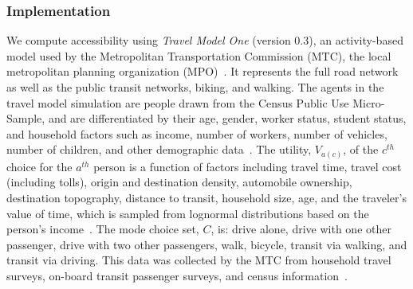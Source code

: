 \subsubsection{Implementation}
We compute accessibility using  \emph{Travel Model One} (version 0.3), an activity-based model used by the Metropolitan Transportation Commission (MTC), the local metropolitan planning organization (MPO)~\cite{erhardt_mtcs_2012}. It represents the full road network as well as the public transit networks, biking, and walking. The agents in the travel model simulation are people drawn from the Census Public Use Micro-Sample, and are differentiated by their age, gender, worker status, student status, and household factors such as income, number of workers, number of vehicles, number of children, and other demographic data~\cite{ory_personal_2013,erhardt_mtcs_2012,waddell_urbansim:_2002,u.s._bureau_of_the_census_united_2010}. The utility, $V_{a(c)}$, of the $c^{th}$ choice for the $a^{th}$ person is a function of factors including travel time, travel cost (including tolls), origin and destination density, automobile ownership, destination topography, distance to transit, household size, age, and the traveler's value of time, which is sampled from lognormal distributions based on the person's income~\cite{metropolitan_technical_2013}. The mode choice set, $C$, is: drive alone, drive with one other passenger, drive with two other passengers, walk, bicycle, transit via walking, and transit via driving. 
This data was collected by the MTC from household travel surveys, on-board transit passenger surveys, and census information~\cite{u.s._bureau_of_the_census_united_2010,kunzmann_2010-2012_2013}. 

